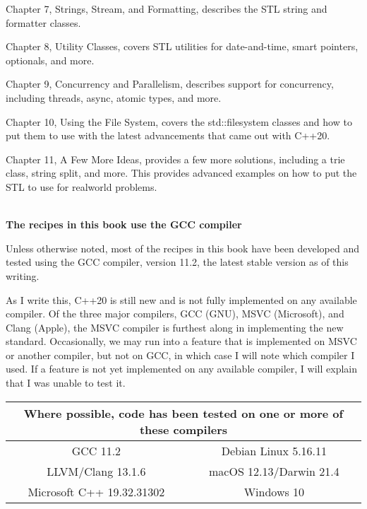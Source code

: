 Chapter 7, Strings, Stream, and Formatting, describes the STL string and formatter classes.

Chapter 8, Utility Classes, covers STL utilities for date-and-time, smart pointers, optionals, and more.

Chapter 9, Concurrency and Parallelism, describes support for concurrency, including threads, async, atomic types, and more.

Chapter 10, Using the File System, covers the std::filesystem classes and how to put them to use with the latest advancements that came out with C++20.

Chapter 11, A Few More Ideas, provides a few more solutions, including a trie class, string split, and more. This provides advanced examples on how to put the STL to use for realworld problems.

\hspace*{\fill} \\ %
\noindent
\textbf{The recipes in this book use the GCC compiler}

Unless otherwise noted, most of the recipes in this book have been developed and tested using the GCC compiler, version 11.2, the latest stable version as of this writing.

As I write this, C++20 is still new and is not fully implemented on any available compiler. Of the three major compilers, GCC (GNU), MSVC (Microsoft), and Clang (Apple), the MSVC compiler is furthest along in implementing the new standard. Occasionally, we may run into a feature that is implemented on MSVC or another compiler, but not on GCC, in which case I will note which compiler I used. If a feature is not yet implemented on any available compiler, I will explain that I was unable to test it.


\begin{table}[H]
	\begin{tabular}{|cc|}
		\hline
		\multicolumn{2}{|c|}{Where possible, code has been tested on one or more of these compilers} \\ \hline
		\multicolumn{1}{|c|}{GCC 11.2}                  & Debian Linux 5.16.11    \\ \hline
		\multicolumn{1}{|c|}{LLVM/Clang 13.1.6}         & macOS 12.13/Darwin 21.4 \\ \hline
		\multicolumn{1}{|c|}{Microsoft C++ 19.32.31302} & Windows 10              \\ \hline
	\end{tabular}
\end{table}



